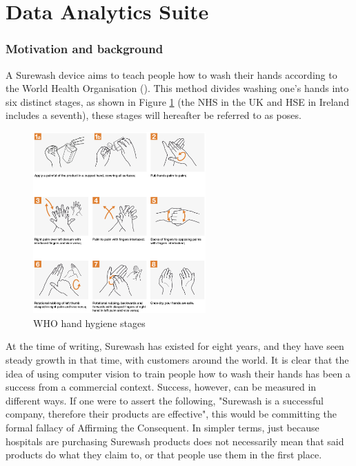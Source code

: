 \part{Data Analytics Suite}
\section{Motivation and background}
A Surewash device aims to teach people how to wash their hands according to the World Health Organisation (\cite{who_handhygiene}). This method divides washing one's hands into six distinct stages, as shown in Figure \ref{fig:who_poses} (the NHS in the UK and HSE in Ireland includes a seventh), these stages will hereafter be referred to as poses.
\begin{figure}[h]
    \centering
    \includegraphics[width=250px]{../img/who_poses.png}
    \caption[]{WHO hand hygiene stages\footnotemark}
    \label{fig:who_poses}
\end{figure}


At the time of writing, Surewash has existed for eight years, and they have seen steady growth in that time, with customers around the world. It is clear that the idea of using computer vision to train people how to wash their hands has been a success from a commercial context. Success, however, can be measured in different ways. If one were to assert the following, "Surewash is a successful company, therefore their products are effective", this would be committing the formal fallacy of Affirming the Consequent. In simpler terms, just because hospitals are purchasing Surewash products does not necessarily mean that said products do what they claim to, or that people use them in the first place.


